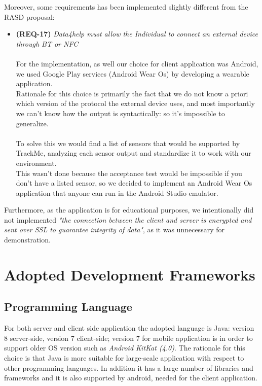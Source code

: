 \documentclass[a4paper]{article}
\begin{document}
Moreover, some requirements has been implemented slightly different from the RASD proposal:
\begin{itemize}
    \item \textbf{(REQ-17)} \textit{Data4help must allow the Individual to connect an external device through BT or NFC}\\\\
    For the implementation, as well our choice for client application was Android, we used Google Play services (Android Wear Os) by developing a wearable application.\\
    Rationale for this choice is primarily the fact that we do not know a priori which version of the protocol the external device uses, and most importantly we can't know how the output is syntactically: so it's impossible to generalize.\\\\
    To solve this we would find a list of sensors that would be supported by TrackMe, analyzing each sensor output and standardize it to work with our environment.\\
    This wasn't done because the acceptance test would be impossible if you don't have a listed sensor, so we decided to implement an Android Wear Os application that anyone can run in the Android Studio emulator.
\end{itemize}

Furthermore, as the application is for educational purposes, we intentionally did not implemented \textit{"the connection between the client and server is encrypted and sent over SSL to guarantee integrity of data"}, as it was unnecessary for demonstration.


\newpage
\section{Adopted Development Frameworks}

\subsection{Programming Language}
For both server and client side application the adopted language is Java: version 8 server-side, version 7 client-side; version 7 for mobile application is in order to support older OS version such as \textit{Android KitKat (4.0)}. The rationale for this choice is that Java is more suitable for large-scale application with respect to other programming languages. In addition it has a large number of libraries and frameworks and it is also supported by android, needed for the client application.
\end{document}
